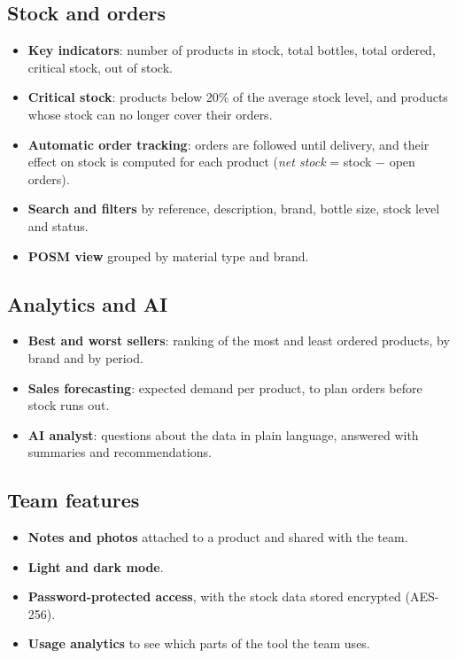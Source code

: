\documentclass[a4paper,11pt]{article}
\begin{document}
\subsection{Stock and orders}
\begin{itemize}
  \item \textbf{Key indicators}: number of products in stock, total bottles, total ordered, critical stock, out of stock.
  \item \textbf{Critical stock}: products below 20\% of the average stock level, and products whose stock can no longer cover their orders.
  \item \textbf{Automatic order tracking}: orders are followed until delivery, and their effect on stock is computed for each product (\emph{net stock} = stock $-$ open orders).
  \item \textbf{Search and filters} by reference, description, brand, bottle size, stock level and status.
  \item \textbf{POSM view} grouped by material type and brand.
\end{itemize}

\subsection{Analytics and AI}
\begin{itemize}
  \item \textbf{Best and worst sellers}: ranking of the most and least ordered products, by brand and by period.
  \item \textbf{Sales forecasting}: expected demand per product, to plan orders before stock runs out.
  \item \textbf{AI analyst}: questions about the data in plain language, answered with summaries and recommendations.
\end{itemize}

\subsection{Team features}
\begin{itemize}
  \item \textbf{Notes and photos} attached to a product and shared with the team.
  \item \textbf{Light and dark mode}.
  \item \textbf{Password-protected access}, with the stock data stored encrypted (AES-256).
  \item \textbf{Usage analytics} to see which parts of the tool the team uses.
\end{itemize}
\end{document}
